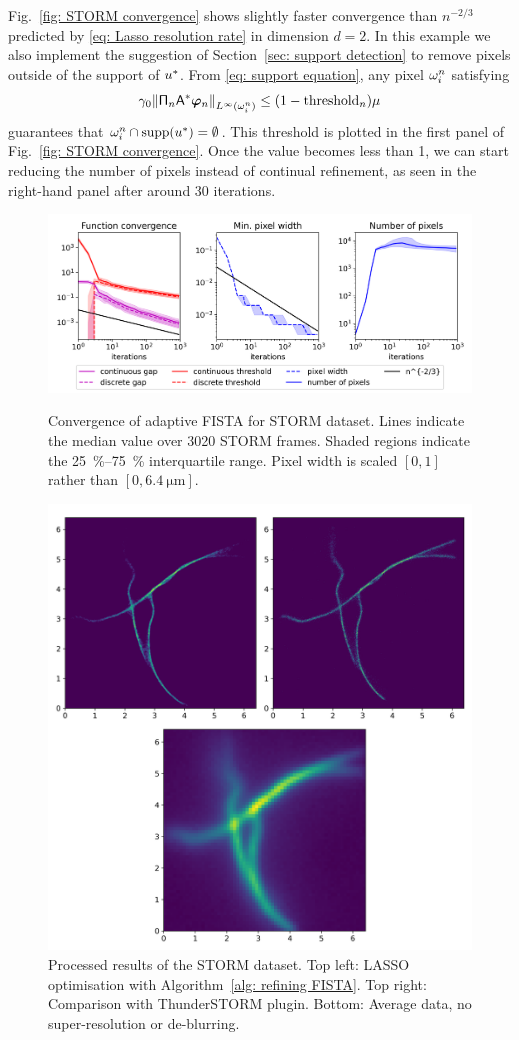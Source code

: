 \documentclass[smallextended]{svjour3}
\newcommand{\norm}[1]{{\left\lVert #1 \right\rVert}}
\newcommand{\op}[1]{\operatorname{#1}}
\newcommand{\1}{\F{1}}
\newcommand*{\var}[1]{%
	\IfEqCase{#1}{%
		{0}{u}%
		{1}{v}%
		{2}{w}%
	}[u#1]%
}
\newcommand*{\vars}[1]{%
	\IfEqCase{#1}{%
		{0}{\alpha}%
		{1}{\beta}%
		{2}{\gamma}%
		{3}{a}%
		{4}{b}%
		{5}{c}%
	}[k#1]%
}
\begin{document}
	Fig.~\ref{fig: STORM convergence} shows slightly faster convergence than $n^{-2/3}$ predicted by \eqref{eq: Lasso resolution rate} in dimension $d=2$. In this example we also implement the suggestion of Section~\ref{sec: support detection} to remove pixels outside of the support of $\var0^*$. From \eqref{eq: support equation}, any pixel $\omega_i^n$ satisfying 
	\begin{equation}
		\vars2_0 \norm{ \tens{\Pi}_n\A^*\vec{\varphi}_n }_{L^\infty(\domain_i^n)} \leq (1-\op{threshold}_n)\mu
	\end{equation}
	guarantees that $\domain_i^n\cap\op{supp}(\var0^*) = \emptyset$. This threshold is plotted in the first panel of Fig.~\ref{fig: STORM convergence}. Once the value becomes less than 1, we can start reducing the number of pixels instead of continual refinement, as seen in the right-hand panel after around 30 iterations.
	
	\begin{figure}\centering
		\includegraphics[width=.82\textwidth]{lasso2_convergence}
		\caption{Convergence of adaptive FISTA for STORM dataset. Lines indicate the median value over 3020 STORM frames. Shaded regions indicate the \SIrange{25}{75}{\percent} interquartile range. Pixel width is scaled $[0,1]$ rather than $[0,\SI{6.4}{\micro\meter}]$.}\label{fig: STORM convergence}
		
		\vspace*{\floatsep}
		
		\includegraphics[width=.73\textwidth]{STORM_recon}
		\caption{Processed results of the STORM dataset. Top left: LASSO optimisation with Algorithm~\ref{alg: refining FISTA}. Top right: Comparison with ThunderSTORM plugin. Bottom: Average data, no super-resolution or de-blurring.}\label{fig: STORM results}
	\end{figure}
	
\end{document}
